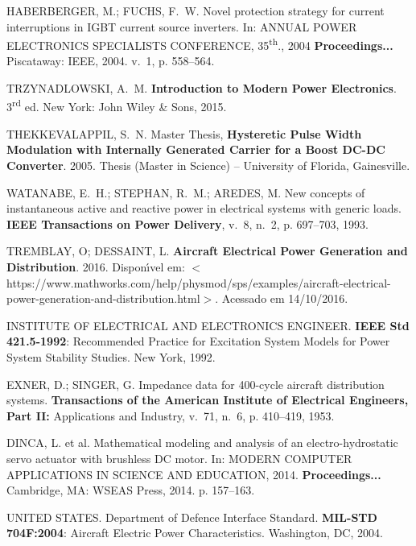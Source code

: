 \begin{thebibliography}{}
{HABERBERGER, M.; FUCHS, F.~W. Novel protection strategy for current
  interruptions in IGBT current source inverters. In: \uppercase{Annual 
  Power Electronics Specialists Conference,} 35\textsuperscript{th}., 2004 
  \textbf{Proceedings...} Piscataway: IEEE, 2004. v.~1, p. 558--564.}

{TRZYNADLOWSKI, A.~M. \textbf{Introduction to Modern Power Electronics}.
	3\textsuperscript{rd} ed. New York: John Wiley \& Sons, 2015.}

{THEKKEVALAPPIL, S.~N.
Master Thesis, \textbf{Hysteretic Pulse Width Modulation with Internally
  Generated Carrier for a Boost DC-DC Converter}. 2005. Thesis (Master in Science) --
  University of Florida, Gainesville.}

{WATANABE, E.~H.; STEPHAN, R.~M.; AREDES, M. New concepts of instantaneous
  active and reactive power in electrical systems with generic loads.
\textbf{IEEE Transactions on Power Delivery}, v.~8, n.~2, p. 697--703,
  1993.}

{TREMBLAY, O; DESSAINT, L. \textbf{Aircraft Electrical Power Generation and
  Distribution}. 2016.
  Dispon{\'\i}vel em:
$<$https://www.mathworks.com/help/physmod/sps/examples/aircraft-electrical- power-generation-and-distribution.html$>$.}
  Acessado em 14/10/2016.


{INSTITUTE OF ELECTRICAL AND ELECTRONICS ENGINEER. \textbf{IEEE Std 421.5-1992}:
  Recommended Practice for Excitation System Models for Power System
  Stability Studies. New York, 1992.}

{EXNER, D.; SINGER, G. Impedance data for 400-cycle aircraft distribution
  systems.
\textbf{Transactions of the American Institute of Electrical Engineers, Part II:}
  Applications and Industry, v.~71, n.~6, p. 410--419, 1953.}

{DINCA, L. et al. Mathematical modeling and analysis of an electro-hydrostatic
  servo actuator with brushless {DC} motor. In: \uppercase{Modern
  Computer Applications in Science and Education}, 2014. \textbf{Proceedings...} Cambridge, MA: WSEAS
  Press, 2014. p. 157--163.}

{UNITED STATES. Department of Defence Interface Standard. \textbf{MIL-STD 704F:2004}: Aircraft
  Electric Power Characteristics. Washington, DC, 2004.}

\end{thebibliography}
